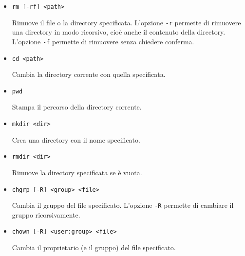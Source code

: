 \documentclass[a4paper]{article}
\begin{document}
\begin{itemize}
\item
\begin{lstlisting}
rm [-rf] <path>
\end{lstlisting}
Rimuove il file o la directory specificata. L'opzione \texttt{-r} permette di rimuovere
una directory in modo ricorsivo, cioè anche il contenuto della directory. L'opzione
\texttt{-f} permette di rimuovere senza chiedere conferma.

\item
\begin{lstlisting}
cd <path>
\end{lstlisting}
Cambia la directory corrente con quella specificata.

\item
\begin{lstlisting}
pwd
\end{lstlisting}
Stampa il percorso della directory corrente.

\item
\begin{lstlisting}
mkdir <dir>
\end{lstlisting}
Crea una directory con il nome specificato.

\item
\begin{lstlisting}
rmdir <dir>
\end{lstlisting}
Rimuove la directory specificata se è vuota.

\item
\begin{lstlisting}
chgrp [-R] <group> <file>
\end{lstlisting}
Cambia il gruppo del file specificato. L'opzione \texttt{-R} permette di cambiare il
gruppo ricorsivamente.

\item
\begin{lstlisting}
chown [-R] <user:group> <file>
\end{lstlisting}
Cambia il proprietario (e il gruppo) del file specificato.


\end{itemize}
\end{document}
